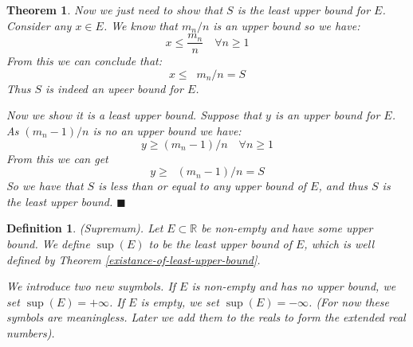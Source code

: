 \documentclass{article}
\newtheorem{definition}{Definition}[subsection]
\newtheorem{theorem}{Theorem}[subsection]
\newcommand{\R}{\mathbb{R}}
\DeclareMathOperator{\infLIM}{\mathrm{LIM}_{n \to \infty}}
\begin{document}
\begin{theorem}
	Now we just need to show that $S$ is the least upper bound 
	for $E$. Consider any $x \in E$. We know 
	that $m_n/n$ is an upper bound so we have: 
	$$
	x \leq \frac{m_n}{n} \quad \forall n \geq 1
	$$
	From this we can conclude that:
	$$
	x \leq \infLIM m_n/n = S
	$$
	Thus $S$ is indeed an upeer bound for $E$. 

	Now we show it is a least upper bound. Suppose
	that $y$ is an upper bound for $E$. 
	As $(m_n - 1)/n$ is no an upper bound we have:
	$$
	y \geq (m_n - 1)/n \quad \forall n \geq 1
	$$
	From this we can get
	$$
	y \geq \infLIM (m_n - 1)/n = S
	$$
	So we have that $S$ is less than or equal 
	to any upper bound of $E$, and thus $S$ 
	is the least upper bound. \hfill $\blacksquare$
\end{theorem}

\begin{definition}
	(Supremum). Let $E \subset \R$ be non-empty 
	and have some upper bound. We define 
	$\sup(E)$ to be the least upper bound 
	of $E$, which is well defined by
	Theorem \ref{existance-of-least-upper-bound}.

	We introduce two new suymbols. If $E$ is 
	non-empty and has no upper bound, we 
	set $\sup(E) = +\infty$. If $E$ is 
	empty, we set $\sup(E) = -\infty$.
	(For now these symbols are meaningless. 
	Later we add them to the reals to form 
	the extended real numbers).
\end{definition}
\end{document}
